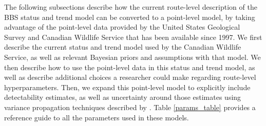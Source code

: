 \documentclass[12pt]{article}
\begin{document}
\par The following subsections describe how the current route-level description of the BBS status and trend model can be converted to a point-level model, by taking advantage of the point-level data provided by the United States Geological Survey and Canadian Wildlife Service that has been available since 1997. 
We first describe the current status and trend model used by the Canadian Wildlife Service, as well as relevant Bayesian priors and assumptions with that model.
We then describe how to use the point-level data in this status and trend model, as well as describe additional choices a researcher could make regarding route-level hyperparameters.
Then, we expand this point-level model to explicitly include detectability estimates, as well as uncertainty around those estimates using variance propagation techniques described by \citep{bravington_variance_2021}.
Table \ref{params_table} provides a reference guide to all the parameters used in these models.
\end{document}
